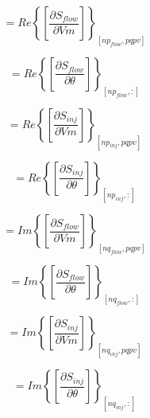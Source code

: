\documentclass[nols,a4paper,twoside,notoc,fleqn]{tufte-book}
\begin{document}
\begin{equation}
[A1] = Re \left\{  \left[  \frac{\partial S_{flow}}{\partial Vm} \right] \right\}_{[np_{flow}, pqpv]}
\end{equation}

\begin{equation}
[A2] = Re \left\{ \left[  \frac{\partial S_{flow}}{\partial \theta} \right] \right\}_{[np_{flow}, :]}
\end{equation}

\begin{equation}
[B1] = Re \left\{ \left[  \frac{\partial S_{inj}}{\partial Vm} \right] \right\}_{[np_{inj}, pqpv]}
\end{equation}


\begin{equation}
[B2] = Re \left\{ \left[   \frac{\partial S_{inj}}{\partial \theta} \right] \right\}_{[np_{inj}, :]}
\end{equation}


\begin{equation}
[C1] = Im\left\{  \left[   \frac{\partial S_{flow}}{\partial Vm}  \right]  \right\}_{[nq_{flow}, pqpv]}
\end{equation}


\begin{equation}
[C2] = Im\left\{ \left[  \frac{\partial S_{flow}}{\partial \theta}  \right] \right\}_{[nq_{flow}, :]}
\end{equation}

\begin{equation}
[D1] = Im\left\{ \left[  \frac{\partial S_{inj}}{\partial Vm}  \right]  \right\}_{[nq_{inj}, pqpv]}
\end{equation}


\begin{equation}
[D2] = Im\left\{ \left[  \frac{\partial S_{inj}}{\partial \theta}   \right] \right\}_{[nq_{inj}, :]}
\end{equation}
\end{document}
